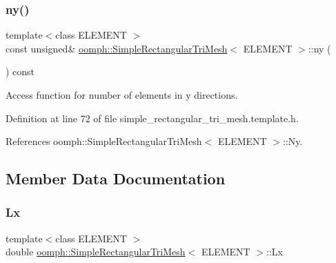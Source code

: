 \mbox{\label{classoomph_1_1SimpleRectangularTriMesh_a39f3713497e6c9fef258d5f239ad5d3b}} 
\subsubsection{\texorpdfstring{ny()}{ny()}}
{\footnotesize\ttfamily template$<$class E\+L\+E\+M\+E\+NT $>$ \\
const unsigned\& \hyperlink{classoomph_1_1SimpleRectangularTriMesh}{oomph\+::\+Simple\+Rectangular\+Tri\+Mesh}$<$ E\+L\+E\+M\+E\+NT $>$\+::ny (\begin{DoxyParamCaption}{ }\end{DoxyParamCaption}) const\hspace{0.3cm}{\ttfamily [inline]}}



Access function for number of elements in y directions. 



Definition at line 72 of file simple\+\_\+rectangular\+\_\+tri\+\_\+mesh.\+template.\+h.



References oomph\+::\+Simple\+Rectangular\+Tri\+Mesh$<$ E\+L\+E\+M\+E\+N\+T $>$\+::\+Ny.



\subsection{Member Data Documentation}
\mbox{\label{classoomph_1_1SimpleRectangularTriMesh_a85d3446550324f92540d389dfb4d063b}} 
\subsubsection{\texorpdfstring{Lx}{Lx}}
{\footnotesize\ttfamily template$<$class E\+L\+E\+M\+E\+NT $>$ \\
double \hyperlink{classoomph_1_1SimpleRectangularTriMesh}{oomph\+::\+Simple\+Rectangular\+Tri\+Mesh}$<$ E\+L\+E\+M\+E\+NT $>$\+::Lx\hspace{0.3cm}{\ttfamily [private]}}



